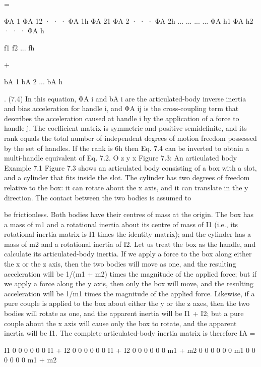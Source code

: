 =

ΦA 1 ΦA 12 · · · ΦA 1h ΦA 21 ΦA 2 · · · ΦA 2h ... ... ... ... ΦA h1 ΦA h2 · · · ΦA h

f1 f2 ... fh

+

bA 1 bA 2 ... bA h

. (7.4) In this equation, ΦA i and bA i are the articulated-body inverse inertia and bias acceleration for handle i, and ΦA ij is the cross-coupling term that describes the acceleration caused at handle i by the application of a force to handle j. The coefficient matrix is symmetric and positive-semidefinite, and its rank equals the total number of independent degrees of motion freedom possessed by the set of handles. If the rank is 6h then Eq. 7.4 can be inverted to obtain a multi-handle equivalent of Eq. 7.2. O z y x Figure 7.3: An articulated body Example 7.1 Figure 7.3 shows an articulated body consisting of a box with a slot, and a cylinder that fits inside the slot. The cylinder has two degrees of freedom relative to the box: it can rotate about the x axis, and it can translate in the y direction. The contact between the two bodies is assumed to

be frictionless. Both bodies have their centres of mass at the origin. The box has a mass of m1 and a rotational inertia about its centre of mass of I1 (i.e., its rotational inertia matrix is I1 times the identity matrix); and the cylinder has a mass of m2 and a rotational inertia of I2. Let us treat the box as the handle, and calculate its articulated-body inertia. If we apply a force to the box along either the x or the z axis, then the two bodies will move as one, and the resulting acceleration will be 1/(m1 + m2) times the magnitude of the applied force; but if we apply a force along the y axis, then only the box will move, and the resulting acceleration will be 1/m1 times the magnitude of the applied force. Likewise, if a pure couple is applied to the box about either the y or the z axes, then the two bodies will rotate as one, and the apparent inertia will be I1 + I2; but a pure couple about the x axis will cause only the box to rotate, and the apparent inertia will be I1. The complete articulated-body inertia matrix is therefore IA =

I1 0 0 0 0 0 0 I1 + I2 0 0 0 0 0 0 I1 + I2 0 0 0 0 0 0 m1 + m2 0 0 0 0 0 0 m1 0 0 0 0 0 0 m1 + m2

